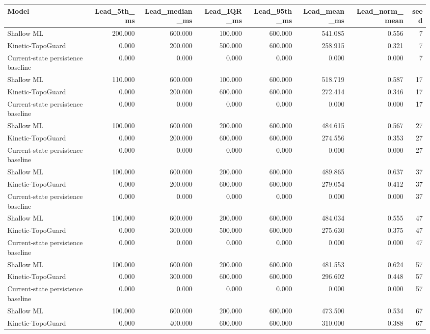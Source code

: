 \begin{tabular}{lrrrrrrr}
\toprule
Model & Lead\_5th\_ms & Lead\_median\_ms & Lead\_IQR\_ms & Lead\_95th\_ms & Lead\_mean\_ms & Lead\_norm\_mean & seed \\
\midrule
Shallow ML & 200.000 & 600.000 & 100.000 & 600.000 & 541.085 & 0.556 & 7 \\
Kinetic-TopoGuard & 0.000 & 200.000 & 500.000 & 600.000 & 258.915 & 0.321 & 7 \\
Current-state persistence baseline & 0.000 & 0.000 & 0.000 & 0.000 & 0.000 & 0.000 & 7 \\
Shallow ML & 110.000 & 600.000 & 100.000 & 600.000 & 518.719 & 0.587 & 17 \\
Kinetic-TopoGuard & 0.000 & 200.000 & 600.000 & 600.000 & 272.414 & 0.346 & 17 \\
Current-state persistence baseline & 0.000 & 0.000 & 0.000 & 0.000 & 0.000 & 0.000 & 17 \\
Shallow ML & 100.000 & 600.000 & 200.000 & 600.000 & 484.615 & 0.567 & 27 \\
Kinetic-TopoGuard & 0.000 & 200.000 & 600.000 & 600.000 & 274.556 & 0.353 & 27 \\
Current-state persistence baseline & 0.000 & 0.000 & 0.000 & 0.000 & 0.000 & 0.000 & 27 \\
Shallow ML & 100.000 & 600.000 & 200.000 & 600.000 & 489.865 & 0.637 & 37 \\
Kinetic-TopoGuard & 0.000 & 200.000 & 600.000 & 600.000 & 279.054 & 0.412 & 37 \\
Current-state persistence baseline & 0.000 & 0.000 & 0.000 & 0.000 & 0.000 & 0.000 & 37 \\
Shallow ML & 100.000 & 600.000 & 200.000 & 600.000 & 484.034 & 0.555 & 47 \\
Kinetic-TopoGuard & 0.000 & 300.000 & 500.000 & 600.000 & 275.630 & 0.375 & 47 \\
Current-state persistence baseline & 0.000 & 0.000 & 0.000 & 0.000 & 0.000 & 0.000 & 47 \\
Shallow ML & 100.000 & 600.000 & 200.000 & 600.000 & 481.553 & 0.624 & 57 \\
Kinetic-TopoGuard & 0.000 & 300.000 & 600.000 & 600.000 & 296.602 & 0.448 & 57 \\
Current-state persistence baseline & 0.000 & 0.000 & 0.000 & 0.000 & 0.000 & 0.000 & 57 \\
Shallow ML & 100.000 & 600.000 & 200.000 & 600.000 & 473.500 & 0.534 & 67 \\
Kinetic-TopoGuard & 0.000 & 400.000 & 600.000 & 600.000 & 310.000 & 0.388 & 67 \\

\end{tabular}
